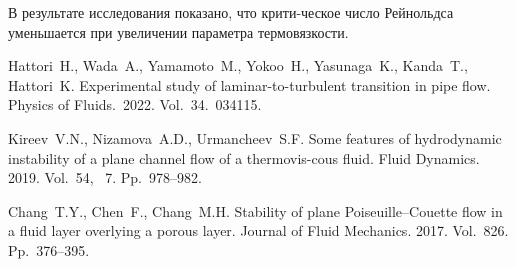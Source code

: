 В результате исследования показано, что крити-ческое число Рейнольдса уменьшается при увеличении параметра термовязкости.

\begin{thebibliography}{9} %


	Hattori~H., Wada~A., Yamamoto~M., Yokoo~H., Yasunaga~K., Kanda~T., Hattori~K. Experimental study of laminar-to-turbulent transition in pipe flow. Physics of Fluids.~2022. Vol.~34.~034115.

	Kireev~V.N., Nizamova~A.D., Urmancheev~S.F. Some features of hydrodynamic instability of a plane channel flow of a thermovis-cous fluid. Fluid Dynamics. 2019. Vol.~54, \textnumero~7. Pp.~978--982.


	Chang~T.Y., Chen~F., Chang~M.H. Stability of plane Poiseuille–Couette flow in a fluid layer overlying a porous layer. Journal of Fluid Mechanics. 2017. Vol.~826. Pp.~376--395.



\end{thebibliography}





%

